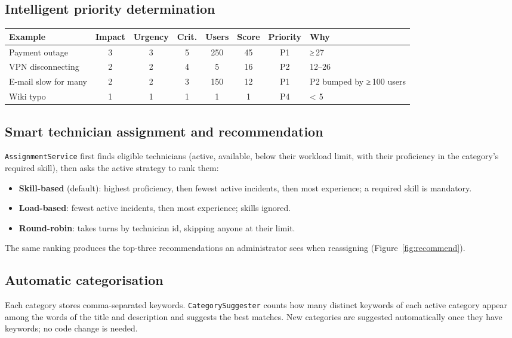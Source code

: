 \documentclass[11pt,a4paper]{article}
\begin{document}
\subsection{Intelligent priority determination}

\begin{tabularx}{\linewidth}{@{}l c c c c c c X@{}}
\toprule
\textbf{Example} & \textbf{Impact} & \textbf{Urgency} & \textbf{Crit.} & \textbf{Users} & \textbf{Score} & \textbf{Priority} & \textbf{Why} \\ \midrule
Payment outage & 3 & 3 & 5 & 250 & 45 & P1 & ≥\,27 \\
VPN disconnecting & 2 & 2 & 4 & 5 & 16 & P2 & 12–26 \\
E-mail slow for many & 2 & 2 & 3 & 150 & 12 & P1 & P2 bumped by ≥\,100 users \\
Wiki typo & 1 & 1 & 1 & 1 & 1 & P4 & < 5 \\ \bottomrule
\end{tabularx}

\subsection{Smart technician assignment and recommendation}
\texttt{AssignmentService} first finds eligible technicians (active, available, below their workload limit, with their proficiency in the category's required skill), then asks the active strategy to rank them:
\begin{itemize}
\item \textbf{Skill-based} (default): highest proficiency, then fewest active incidents, then most experience; a required skill is mandatory.
\item \textbf{Load-based}: fewest active incidents, then most experience; skills ignored.
\item \textbf{Round-robin}: takes turns by technician id, skipping anyone at their limit.
\end{itemize}
The same ranking produces the top-three recommendations an administrator sees when reassigning (Figure~\ref{fig:recommend}).

\subsection{Automatic categorisation}
Each category stores comma-separated keywords. \texttt{CategorySuggester} counts how many distinct keywords of each active category appear among the words of the title and description and suggests the best matches. New categories are suggested automatically once they have keywords; no code change is needed.
\end{document}
